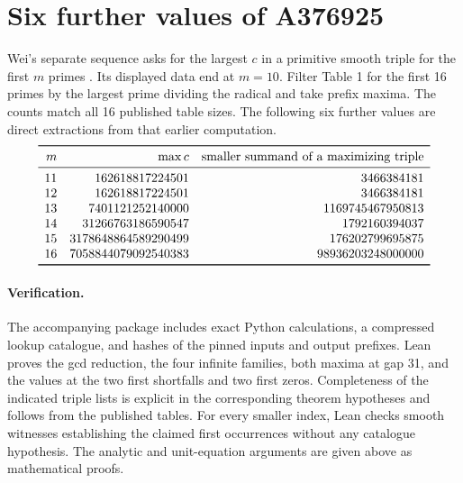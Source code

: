 \documentclass[11pt,letterpaper]{article}
\begin{document}
\section{Six further values of A376925}
Wei's separate sequence asks for the largest $c$ in a primitive smooth triple for the first $m$ primes \cite{oeis}. Its displayed data end at $m=10$. Filter Table 1 for the first 16 primes \cite{data} by the largest prime dividing the radical and take prefix maxima. The counts match all 16 published table sizes. The following six further values are direct extractions from that earlier computation.
\[
\begin{array}{rrr}
\toprule
m & \max c & \text{smaller summand of a maximizing triple}\\
\midrule
11 &162618817224501 &3466384181\\
12 &162618817224501 &3466384181\\
13 &7401121252140000 &1169745467950813\\
14 &31266763186590547 &1792160394037\\
15 &3178648864589290499 &176202799695875\\
16 &7058844079092540383 &98936203248000000\\
\bottomrule
\end{array}
\]

\paragraph{Verification.} The accompanying package includes exact Python calculations, a compressed lookup catalogue, and hashes of the pinned inputs and output prefixes. Lean proves the gcd reduction, the four infinite families, both maxima at gap 31, and the values at the two first shortfalls and two first zeros. Completeness of the indicated triple lists is explicit in the corresponding theorem hypotheses and follows from the published tables. For every smaller index, Lean checks smooth witnesses establishing the claimed first occurrences without any catalogue hypothesis. The analytic and unit-equation arguments are given above as mathematical proofs.
\end{document}
